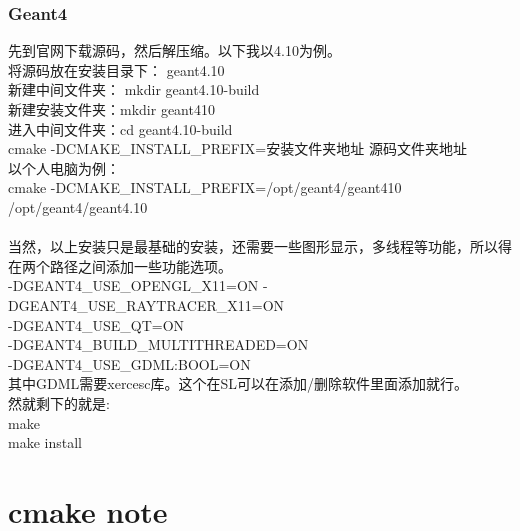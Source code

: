 \documentclass[11pt,a4paper,titlepage]{article}
\begin{document}
\subsubsection{Geant4}
先到官网下载源码，然后解压缩。以下我以4.10为例。\\
将源码放在安装目录下：    geant4.10 \\
新建中间文件夹： mkdir geant4.10-build\\
新建安装文件夹：mkdir geant410\\
进入中间文件夹：cd geant4.10-build\\
cmake -DCMAKE\_INSTALL\_PREFIX=安装文件夹地址  源码文件夹地址\\
以个人电脑为例：\\
cmake -DCMAKE\_INSTALL\_PREFIX=/opt/geant4/geant410   /opt/geant4/geant4.10\\
\\
当然，以上安装只是最基础的安装，还需要一些图形显示，多线程等功能，所以得在两个路径之间添加一些功能选项。\\
-DGEANT4\_USE\_OPENGL\_X11=ON -DGEANT4\_USE\_RAYTRACER\_X11=ON \\
-DGEANT4\_USE\_QT=ON\\
-DGEANT4\_BUILD\_MULTITHREADED=ON\\
-DGEANT4\_USE\_GDML:BOOL=ON\\
其中GDML需要xercesc库。这个在SL可以在添加/删除软件里面添加就行。\\

然就剩下的就是:\\
make\\
make install\\

\section{cmake note}
\end{document}
